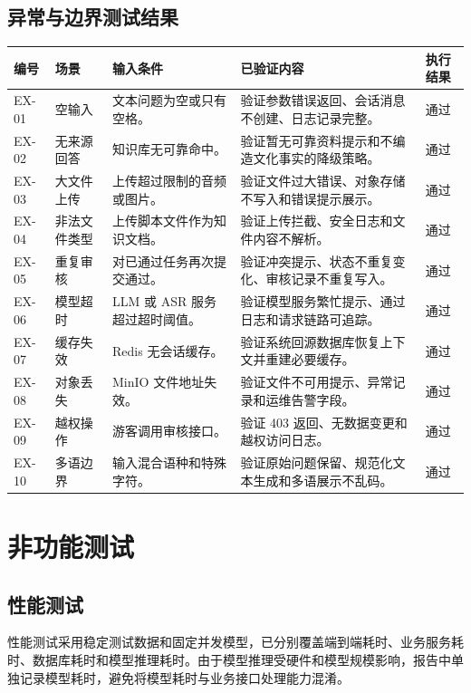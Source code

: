 \subsection{异常与边界测试结果}

\begin{longtable}{p{1.2cm}p{2.4cm}p{3.6cm}p{4.7cm}p{1.3cm}}
\toprule
编号 & 场景 & 输入条件 & 已验证内容 & 执行结果 \\
\midrule
EX-01 & 空输入 & 文本问题为空或只有空格。 & 验证参数错误返回、会话消息不创建、日志记录完整。 &通过\\
EX-02 & 无来源回答 & 知识库无可靠命中。 & 验证暂无可靠资料提示和不编造文化事实的降级策略。 &通过\\
EX-03 & 大文件上传 & 上传超过限制的音频或图片。 & 验证文件过大错误、对象存储不写入和错误提示展示。 &通过\\
EX-04 & 非法文件类型 & 上传脚本文件作为知识文档。 & 验证上传拦截、安全日志和文件内容不解析。 &通过\\
EX-05 & 重复审核 & 对已通过任务再次提交通过。 & 验证冲突提示、状态不重复变化、审核记录不重复写入。 &通过\\
EX-06 & 模型超时 & LLM 或 ASR 服务超过超时阈值。 & 验证模型服务繁忙提示、通过日志和请求链路可追踪。 &通过\\
EX-07 & 缓存失效 & Redis 无会话缓存。 & 验证系统回源数据库恢复上下文并重建必要缓存。 &通过\\
EX-08 & 对象丢失 & MinIO 文件地址失效。 & 验证文件不可用提示、异常记录和运维告警字段。 &通过\\
EX-09 & 越权操作 & 游客调用审核接口。 & 验证 403 返回、无数据变更和越权访问日志。 &通过\\
EX-10 & 多语边界 & 输入混合语种和特殊字符。 & 验证原始问题保留、规范化文本生成和多语展示不乱码。 &通过\\
\bottomrule
\end{longtable}

\section{非功能测试}

\subsection{性能测试}

性能测试采用稳定测试数据和固定并发模型，已分别覆盖端到端耗时、业务服务耗时、数据库耗时和模型推理耗时。由于模型推理受硬件和模型规模影响，报告中单独记录模型耗时，避免将模型耗时与业务接口处理能力混淆。

